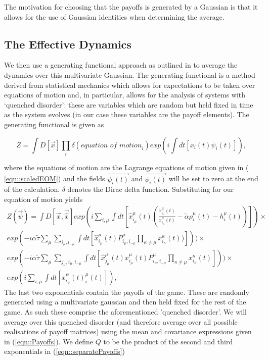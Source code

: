 \documentclass[sigconf,anonymous]{aamas}
\newcommand{\xmu}[2]{x_{#1_#2}^{#2}(t)}
\newcommand{\payoff}[2]{P^{#2}_{#1_#2, #1_{-#2}}}
\newcommand{\dxmu}[1]{\dot{x}_{#1_\mu}^{\mu} (t)}
\newcommand{\hxmu}[1]{\hat{x}_{#1_\mu}^{\mu} (t)}
\newcommand{\talpha}{\tilde{\alpha}}
\newcommand{\ttau}{\tilde{\tau}}
\begin{document}
The motivation for choosing that the payoffs is generated by a
Gaussian is that it allows for the use of Gaussian identities when
determining the average.

\subsection{The Effective Dynamics}

We then use a generating functional approach as outlined in
\cite{Mezard1986} to average the dynamics over this multivariate
Gaussian. The generating functional is a method derived from
statistical mechanics which allows for expectations to be taken over
equations of motion and, in particular, allows for the analysis of
systems with `quenched disorder': these are
variables which are random but held fixed in time as the system
evolves (in our case these variables are the payoff elements). The
generating functional is given as \cite{Mezard1986}

\begin{equation}
	Z = \int D[\Vec{x}] \prod_i \delta(\textit{equation of motion}_i) exp(i
	\int dt[x_i(t) \psi_i(t)]), 
\end{equation}

where the equations of motion are the Lagrange equations of motion
given in ( \ref{eqn::scaledEOM}) and the fields $\Vec{\psi_i(t)}$ and
$\Vec{\phi_i(t)}$ will be set to zero at the end of the
calculation. $\delta$ denotes the Dirac delta function. Substituting
for our equation of motion yields
%
{\small
\begin{equation}
\label{eqn::separatePayoffs}
	\begin{split}
	Z(\Vec{\psi}) = \int D[\Vec{x}, \Vec{\hat{x}}] exp( i \sum_{i, \mu} \int dt [ \hxmu{i} (\frac{\dxmu{i}}{\xmu{i}{\mu}} - \talpha \rho_i^\mu (t) - h_i^\mu (t))]) \times \\ exp(-i \alpha \ttau \sum_{\mu} \sum_{i_\mu, i_{-\mu}} \int dt [\hxmu{i} \payoff{i}{\mu} \prod_{\kappa \neq \mu} \xmu{i}{\kappa} )])) 
    \times \\ exp(-i \alpha \ttau \sum_{\mu} \sum_{j_\mu, i_\mu, i_{-\mu}} \int dt [\hxmu{j}  \xmu{i}{\mu} \payoff{i}{\mu} \prod_{\kappa \neq \mu} \xmu{i}{\kappa}])) 
	\times \\ exp(i \sum_{i, \mu}
	\int dt[\xmu{i} \psi^\mu_i(t)]),
\end{split}
\end{equation}
}
The last two exponentials contain the payoffs of the game. These are randomly generated using a multivariate gaussian and then held fixed for the rest of the game. As such these comprise the aforementioned 'quenched disorder'. We will average over this quenched disorder (and therefore average over all possible realisations of payoff matrices) using the mean and covariance expressions given in (\ref{eqn::Payoffs}). We define $Q$ to be the product of the second and third exponentials in (\ref{eqn::separatePayoffs}) 
%
\end{document}
